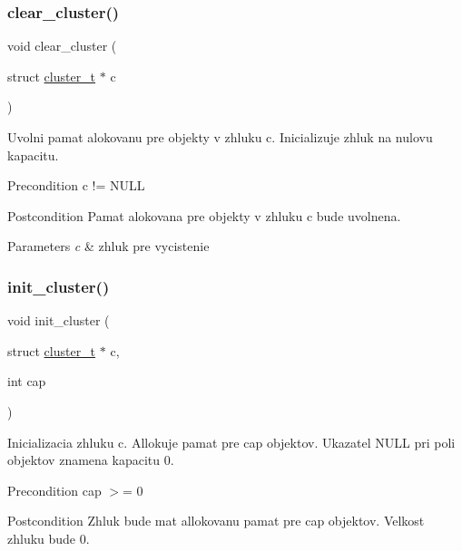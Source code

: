 \subsubsection{\texorpdfstring{clear\+\_\+cluster()}{clear\_cluster()}}
{\footnotesize\ttfamily void clear\+\_\+cluster (\begin{DoxyParamCaption}\item[{struct \hyperlink{structcluster__t}{cluster\+\_\+t} $\ast$}]{c }\end{DoxyParamCaption})}

Uvolni pamat alokovanu pre objekty v zhluku \textquotesingle{}c\textquotesingle{}. Inicializuje zhluk na nulovu kapacitu.

\begin{DoxyPrecond}{Precondition}
c != N\+U\+LL
\end{DoxyPrecond}
\begin{DoxyPostcond}{Postcondition}
Pamat alokovana pre objekty v zhluku \textquotesingle{}c\textquotesingle{} bude uvolnena.
\end{DoxyPostcond}

\begin{DoxyParams}{Parameters}
{\em c} & zhluk pre vycistenie \\
\hline
\end{DoxyParams}
\mbox{\label{group__clust_ga96db0862471d90abb3d80103ef3695f7}} 
\subsubsection{\texorpdfstring{init\+\_\+cluster()}{init\_cluster()}}
{\footnotesize\ttfamily void init\+\_\+cluster (\begin{DoxyParamCaption}\item[{struct \hyperlink{structcluster__t}{cluster\+\_\+t} $\ast$}]{c,  }\item[{int}]{cap }\end{DoxyParamCaption})}

Inicializacia zhluku \textquotesingle{}c\textquotesingle{}. Allokuje pamat pre \textquotesingle{}cap\textquotesingle{} objektov. Ukazatel N\+U\+LL pri poli objektov znamena kapacitu 0.

\begin{DoxyPrecond}{Precondition}
\textquotesingle{}cap\textquotesingle{} $>$= 0
\end{DoxyPrecond}
\begin{DoxyPostcond}{Postcondition}
Zhluk bude mat allokovanu pamat pre \textquotesingle{}cap\textquotesingle{} objektov. Velkost zhluku bude 0.
\end{DoxyPostcond}

